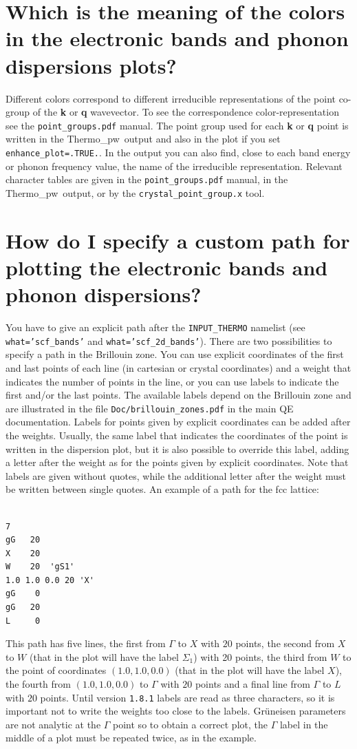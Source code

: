 \documentclass[12pt,a4paper,twoside]{report}
\def\thermo{{\sc Thermo}\_{\sc pw}}
\begin{document}
{\color{coral}\section{Which is the meaning of the colors in
the electronic bands and phonon dispersions plots?}}
\color{black}
Different colors correspond to different irreducible representations of 
the point co-group of the {\bf k} or {\bf q} wavevector. To see the
correspondence color-representation see the \texttt{point\_groups.pdf} 
manual. The point group used for each {\bf k} or {\bf q} point is
written in the \thermo\ output and also in the plot if you set
\texttt{enhance\_plot=.TRUE.}. In the output you can also find,
close to each band energy or phonon frequency value, the name of the
irreducible representation. Relevant character tables are given in the
\texttt{point\_groups.pdf} manual, in the \thermo\ output, or by the
\texttt{crystal\_point\_group.x} tool.

\newpage
{\color{coral}\section{How do I specify a custom path for 
plotting the electronic bands and phonon dispersions?}}
\color{black}
You have to give an explicit path after the \texttt{INPUT\_THERMO}
namelist (see \texttt{what='scf\_bands'} and \texttt{what='scf\_2d\_bands'}). 
There are two possibilities to specify a path in the Brillouin zone.
You can use explicit coordinates of the first and last points of 
each line (in cartesian or crystal coordinates) and a weight that indicates
the number of points in the line, or you can use labels to 
indicate the first and/or the last points. The available labels depend on
the Brillouin zone and are illustrated in the file
\texttt{Doc/brillouin\_zones.pdf} in the main QE documentation.
Labels for points given by explicit coordinates can be added after 
the weights. 
Usually, the same label that indicates the coordinates of the point
is written in the dispersion plot, but it is also possible
to override this label, adding a letter after the weight as for 
the points given by explicit coordinates. 
Note that labels are given without quotes, while the additional letter
after the weight must be written between single quotes.
An example of a path for the fcc lattice:
\begin{verbatim}

7
gG   20   
X    20
W    20  'gS1'
1.0 1.0 0.0 20 'X'
gG    0
gG   20   
L     0
\end{verbatim}
This path has five lines, the first from $\Gamma$ to $X$ with $20$ points,
the second from $X$ to $W$ (that in the plot will have the label $\Sigma_1$)
with 20 points, the third from $W$ to the point of coordinates 
$(1.0, 1.0, 0.0)$ 
(that in the plot will have the label $X$), the fourth from $(1.0, 1.0, 0.0)$ 
to $\Gamma$ with $20$ points and a final line from $\Gamma$ to $L$ with 
$20$ points.
Until version \texttt{1.8.1} labels are read as three characters, so it 
is important not to write the weights too close to the labels.
Gr\"uneisen parameters are not analytic at the $\Gamma$ 
point so to obtain a correct plot, the $\Gamma$ label in the middle of a 
plot must be repeated twice, as in the example.
\end{document}
